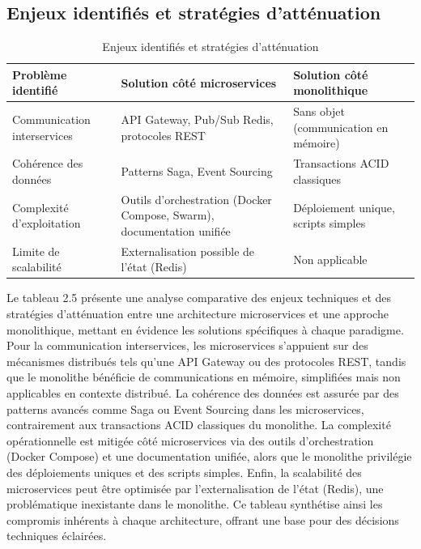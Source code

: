 \documentclass[12pt]{rapportPfe}
\begin{document}
\subsection{Enjeux identifiés et stratégies d’atténuation}

\begin{table}[H]
\centering
\begin{tabular}{|p{4.5cm}|p{5cm}|p{5cm}|}
\hline
\textbf{Problème identifié} & \textbf{Solution côté microservices} & \textbf{Solution côté monolithique} \\
\hline
Communication interservices & API Gateway, Pub/Sub Redis, protocoles REST & Sans objet (communication en mémoire) \\
\hline
Cohérence des données & Patterns Saga, Event Sourcing & Transactions ACID classiques \\
\hline
Complexité d’exploitation & Outils d’orchestration (Docker Compose, Swarm), documentation unifiée & Déploiement unique, scripts simples \\
\hline
Limite de scalabilité & Externalisation possible de l’état (Redis) & Non applicable \\
\hline
\end{tabular}
\caption{Enjeux identifiés et stratégies d’atténuation}
\label{tab:prob_solut}
\end{table}

Le tableau 2.5 présente une analyse comparative des enjeux techniques et des stratégies d’atténuation entre une architecture microservices et une approche monolithique, mettant en évidence les solutions spécifiques à chaque paradigme. Pour la communication interservices, les microservices s’appuient sur des mécanismes distribués tels qu’une API Gateway ou des protocoles REST, tandis que le monolithe bénéficie de communications en mémoire, simplifiées mais non applicables en contexte distribué. La cohérence des données est assurée par des patterns avancés comme Saga ou Event Sourcing dans les microservices, contrairement aux transactions ACID classiques du monolithe. La complexité opérationnelle est mitigée côté microservices via des outils d’orchestration (Docker Compose) et une documentation unifiée, alors que le monolithe privilégie des déploiements uniques et des scripts simples. Enfin, la scalabilité des microservices peut être optimisée par l’externalisation de l’état (Redis), une problématique inexistante dans le monolithe. Ce tableau synthétise ainsi les compromis inhérents à chaque architecture, offrant une base pour des décisions techniques éclairées.
\end{document}
